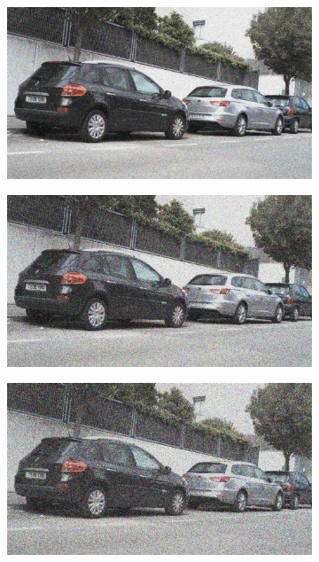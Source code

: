 \documentclass[a4paper]{ctexart}
\begin{document}
\begin{figure}[htbp]
\begin{subfigure}{0.08\textwidth}
				\label{fig：Gamma=0.8, Gauss Noise = 0.1}
			\end{subfigure}
			\begin{subfigure}{0.08\textwidth}
				\captionsetup{font=scriptsize}
				\includegraphics[width=\linewidth]{picture/Edge Detection/degrade/RGB_001 Gamma=0.8, Gauss Noise=0.2}
				\label{fig：Gamma=0.8, Gauss Noise = 0.2}
			\end{subfigure}
			\begin{subfigure}{0.08\textwidth}
				\captionsetup{font=scriptsize}
				\includegraphics[width=\linewidth]{picture/Edge Detection/degrade/RGB_001 Gamma=0.8, Gauss Noise=0.3}
				\label{fig：Gamma=0.8, Gauss Noise = 0.3}
			\end{subfigure}
			\begin{subfigure}{0.08\textwidth}
				\captionsetup{font=scriptsize}
				\includegraphics[width=\linewidth]{picture/Edge Detection/degrade/RGB_001 Gamma=0.8, Gauss Noise=0.4}

\end{subfigure}
\end{figure}
\end{document}
